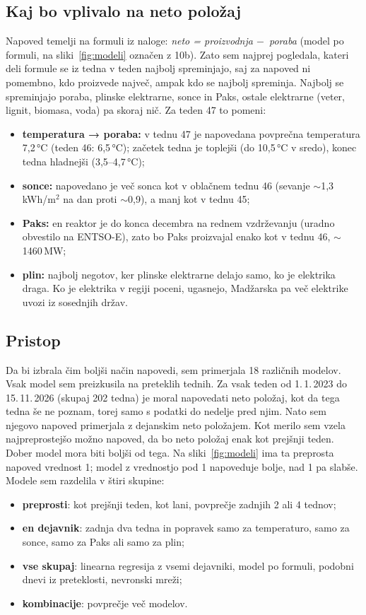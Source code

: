 \documentclass[10pt,a4paper]{article}
\newcommand{\m}{$-$}
\begin{document}
\subsection*{Kaj bo vplivalo na neto položaj}

Napoved temelji na formuli iz naloge: \emph{neto = proizvodnja \m\ poraba} (model po formuli, na
sliki~\ref{fig:modeli} označen z 10b). Zato sem najprej pogledala, kateri deli formule se iz tedna v teden
najbolj spreminjajo, saj za napoved ni pomembno, kdo proizvede največ, ampak kdo se najbolj spreminja. Najbolj se
spreminjajo poraba, plinske elektrarne, sonce in Paks, ostale elektrarne (veter, lignit, biomasa, voda) pa skoraj
nič. Za teden 47 to pomeni:
\begin{itemize}\setlength\itemsep{1pt}
\item \textbf{temperatura → poraba:} v tednu 47 je napovedana povprečna temperatura 7,2\,°C (teden 46: 6,5\,°C);
začetek tedna je toplejši (do 10,5\,°C v sredo), konec tedna hladnejši (3,5–4,7\,°C);
\item \textbf{sonce:} napovedano je več sonca kot v oblačnem tednu 46 (sevanje $\sim$1,3\,kWh/m$^2$ na dan proti
$\sim$0,9), a manj kot v tednu 45;
\item \textbf{Paks:} en reaktor je do konca decembra na rednem vzdrževanju (uradno obvestilo na ENTSO-E), zato bo
Paks proizvajal enako kot v tednu 46, $\sim$1460\,MW;
\item \textbf{plin:} najbolj negotov, ker plinske elektrarne delajo samo, ko je elektrika draga. Ko je elektrika v
regiji poceni, ugasnejo, Madžarska pa več elektrike uvozi iz sosednjih držav.
\end{itemize}

\subsection*{Pristop}

Da bi izbrala čim boljši način napovedi, sem primerjala 18 različnih modelov. Vsak model sem preizkusila na
preteklih tednih. Za vsak teden od 1.\,1.\,2023 do 15.\,11.\,2026 (skupaj 202 tedna) je moral napovedati neto
položaj, kot da tega tedna še ne poznam, torej samo s podatki do nedelje pred njim. Nato sem njegovo napoved
primerjala z dejanskim neto položajem. Kot merilo sem vzela najpreprostejšo možno napoved, da bo neto položaj
enak kot prejšnji teden. Dober model mora biti boljši od tega. Na sliki~\ref{fig:modeli} ima ta preprosta napoved
vrednost 1; model z vrednostjo pod 1 napoveduje bolje, nad 1 pa slabše. Modele sem razdelila v štiri skupine:
\begin{itemize}\setlength\itemsep{1pt}
\item \textbf{preprosti}: kot prejšnji teden, kot lani, povprečje zadnjih 2 ali 4 tednov;
\item \textbf{en dejavnik}: zadnja dva tedna in popravek samo za temperaturo, samo za sonce, samo za Paks ali samo za plin;
\item \textbf{vse skupaj}: linearna regresija z vsemi dejavniki, model po formuli, podobni dnevi iz preteklosti, nevronski mreži;
\item \textbf{kombinacije}: povprečje več modelov.
\end{itemize}
\end{document}
